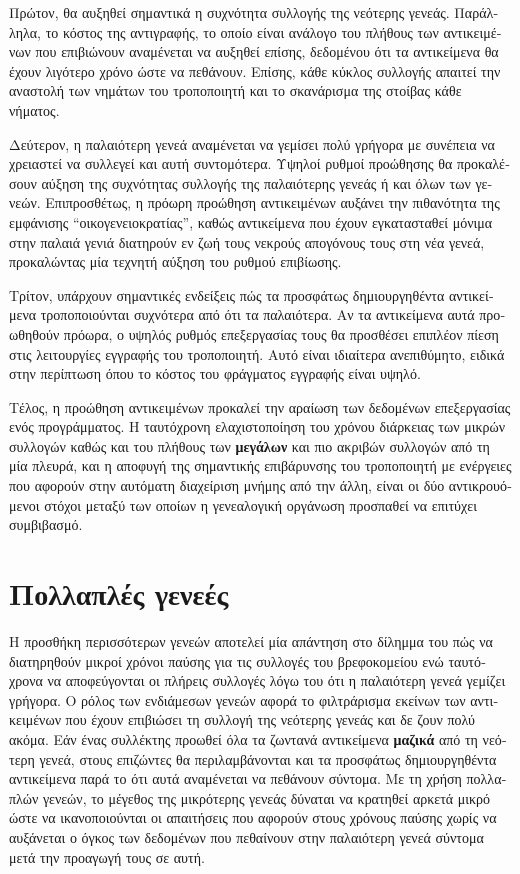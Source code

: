 \begin{greek}
Πρώτον, θα αυξηθεί σημαντικά η συχνότητα συλλογής της νεότερης γενεάς. Παράλληλα, το 
κόστος της αντιγραφής, το οποίο είναι ανάλογο του πλήθους των αντικειμένων που επιβιώνουν 
αναμένεται να αυξηθεί επίσης, δεδομένου ότι τα αντικείμενα θα έχουν λιγότερο χρόνο
ώστε να πεθάνουν. Επίσης, κάθε κύκλος συλλογής απαιτεί την αναστολή των νημάτων του
τροποποιητή και το σκανάρισμα της στοίβας κάθε νήματος.

Δεύτερον, η παλαιότερη γενεά αναμένεται να γεμίσει πολύ γρήγορα με συνέπεια να χρειαστεί
να συλλεγεί και αυτή συντομότερα. Υψηλοί ρυθμοί προώθησης θα προκαλέσουν αύξηση της
συχνότητας συλλογής της παλαιότερης γενεάς ή και όλων των γενεών. Επιπροσθέτως, η
πρόωρη προώθηση αντικειμένων αυξάνει την πιθανότητα της εμφάνισης ``οικογενειοκρατίας'',
καθώς αντικείμενα που έχουν εγκατασταθεί μόνιμα στην παλαιά γενιά διατηρούν εν ζωή τους
νεκρούς απογόνους τους στη νέα γενεά, προκαλώντας μία τεχνητή αύξηση του ρυθμού 
επιβίωσης.
 
Τρίτον, υπάρχουν σημαντικές ενδείξεις πώς τα προσφάτως δημιουργηθέντα αντικείμενα
τροποποιούνται συχνότερα από ότι τα παλαιότερα. Αν τα αντικείμενα αυτά προωθηθούν 
πρόωρα, ο υψηλός ρυθμός επεξεργασίας τους θα προσθέσει επιπλέον πίεση στις λειτουργίες
εγγραφής του τροποποιητή. Αυτό είναι ιδιαίτερα ανεπιθύμητο, ειδικά στην περίπτωση όπου
το κόστος του φράγματος εγγραφής είναι υψηλό. 

Τέλος, η προώθηση αντικειμένων προκαλεί την αραίωση των δεδομένων επεξεργασίας ενός
προγράμματος. Η ταυτόχρονη ελαχιστοποίηση του χρόνου διάρκειας των μικρών συλλογών καθώς 
και του πλήθους των \textbf{μεγάλων} και πιο ακριβών συλλογών από τη μία πλευρά, 
και η αποφυγή της σημαντικής επιβάρυνσης του τροποποιητή με ενέργειες που αφορούν στην 
αυτόματη διαχείριση μνήμης από την άλλη, είναι οι δύο αντικρουόμενοι στόχοι μεταξύ των 
οποίων η γενεαλογική οργάνωση προσπαθεί να επιτύχει συμβιβασμό.

\section{Πολλαπλές γενεές}
Η προσθήκη περισσότερων γενεών αποτελεί μία απάντηση στο δίλημμα του πώς να διατηρηθούν
μικροί χρόνοι παύσης για τις συλλογές του βρεφοκομείου ενώ ταυτόχρονα να αποφεύγονται οι
πλήρεις συλλογές λόγω του ότι η παλαιότερη γενεά γεμίζει γρήγορα. Ο ρόλος των ενδιάμεσων
γενεών αφορά το φιλτράρισμα εκείνων των αντικειμένων που έχουν επιβιώσει τη συλλογή της 
νεότερης γενεάς και δε ζουν πολύ ακόμα. Εάν ένας συλλέκτης προωθεί όλα τα ζωντανά
αντικείμενα \textbf{μαζικά} από τη νεότερη γενεά, στους επιζώντες θα 
περιλαμβάνονται και τα προσφάτως δημιουργηθέντα αντικείμενα παρά το ότι αυτά αναμένεται
να πεθάνουν σύντομα. Με τη χρήση πολλαπλών γενεών, το μέγεθος της μικρότερης γενεάς
δύναται να κρατηθεί αρκετά μικρό ώστε να ικανοποιούνται οι απαιτήσεις που αφορούν στους
χρόνους παύσης χωρίς να αυξάνεται ο όγκος των δεδομένων που πεθαίνουν στην παλαιότερη
γενεά σύντομα μετά την προαγωγή τους σε αυτή.


\end{greek}
